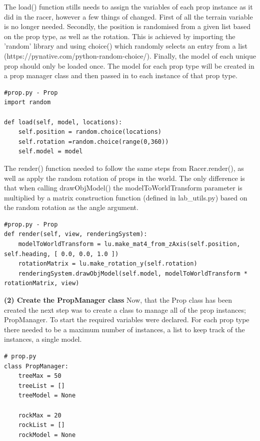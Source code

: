 \documentclass[a4 paper, 12pt]{article}
\begin{document}
The load() function stills needs to assign the variables of each prop instance as it did in the racer, however a few things of changed. First of all the terrain variable is no longer needed. Secondly, the position is randomised from a given list based on the prop type, as well as the rotation. This is achieved by importing the 'random' library and using choice() which randomly selects an entry from a list (https://pynative.com/python-random-choice/). Finally, the model of each unique prop should only be loaded once. The model for each prop type will be created in a prop manager class and then passed in to each instance of that prop type.
    \begin{lstlisting}
#prop.py - Prop
import random

def load(self, model, locations):      
    self.position = random.choice(locations)
    self.rotation =random.choice(range(0,360))
    self.model = model
    \end{lstlisting}

The render() function needed to follow the same steps from Racer.render(), as well as apply the random rotation of props in the world. The only difference is that when calling drawObjModel() the modelToWorldTransform parameter is multiplied by a matrix construction function (defined in lab\_utils.py) based on the random rotation as the angle argument. 
    \begin{lstlisting}
#prop.py - Prop
def render(self, view, renderingSystem):
    modelToWorldTransform = lu.make_mat4_from_zAxis(self.position, self.heading, [ 0.0, 0.0, 1.0 ])
    rotationMatrix = lu.make_rotation_y(self.rotation)
    renderingSystem.drawObjModel(self.model, modelToWorldTransform * rotationMatrix, view)
    \end{lstlisting}
 
\textbf{(2) Create the PropManager class}
Now, that the Prop class has been created the next step was to create a class to manage all of the prop instances; PropManager. To start the required variables were declared. For each prop type there needed to be a maximum number of instances, a list to keep track of the instances, a single model.
    \begin{lstlisting}
# prop.py
class PropManager: 
    treeMax = 50
    treeList = []
    treeModel = None

    rockMax = 20
    rockList = []
    rockModel = None
    \end{lstlisting} 
\end{document}

